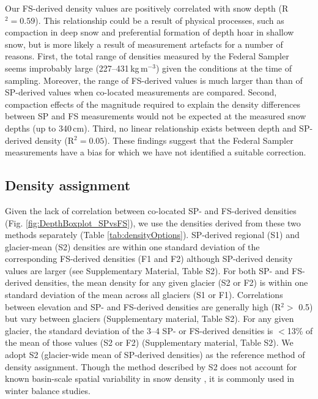 \documentclass[review,oneside, letterpaper]{igs} %
\begin{document}
Our FS-derived density values are positively correlated with snow depth (R$^2= 0.59$). This relationship could be a result of physical processes, such as compaction in deep snow and preferential formation of depth hoar in shallow snow, but is more likely a result of measurement artefacts for a number of reasons. First, the total range of densities measured by the Federal Sampler seems improbably large (227--431\,kg\,m$^{-3}$) given the conditions at the time of sampling. Moreover, the range of FS-derived values is much larger than than of SP-derived values when co-located measurements are compared. Second, compaction effects of the magnitude required to explain the density differences between SP and FS measurements would not be expected at the measured snow depths (up to 340\,cm). Third, no linear relationship exists between depth and SP-derived density (R$^2 = 0.05$). These findings suggest that the Federal Sampler measurements have a bias for which we have not identified a suitable correction.

\subsection{Density assignment}

Given the lack of correlation between co-located SP- and FS-derived densities (Fig. \ref{fig:DepthBoxplot_SPvsFS}), we use the densities derived from these two methods separately (Table \ref{tab:densityOptions}). SP-derived regional (S1) and glacier-mean (S2) densities are within one standard deviation of the corresponding FS-derived densities (F1 and F2) although SP-derived density values are larger (see Supplementary Material, Table S2). For both SP- and FS-derived densities, the mean density for any given glacier (S2 or F2) is within one standard deviation of the mean across all glaciers (S1 or F1). Correlations between elevation and SP- and FS-derived densities are generally high (R$^2>$ 0.5) but vary between glaciers (Supplementary material, Table S2). For any given glacier, the standard deviation of the 3--4 SP- or FS-derived densities is $<$13\% of the mean of those values (S2 or F2) (Supplementary material, Table S2). We adopt S2 (glacier-wide mean of SP-derived densities) as the reference method of density assignment. Though the method described by S2 does not account for known basin-scale spatial variability in snow density \citep[e.g.][]{Wetlaufer2016}, it is commonly used in winter balance studies\citep[e.g.][]{Elder1991,McGrath2015,Cullen2017}. 
\end{document}
